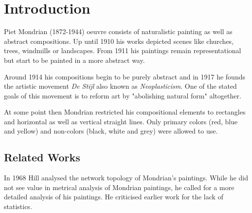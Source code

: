 \section{Introduction}

Piet Mondrian (1872-1944) oeuvre consists of naturalistic painting as well
as abstract compositions. Up until 1910 his works depicted scenes like
churches, trees, windmills or landscapes. From 1911 his paintings
remain representational but start to be painted in a more abstract way.

Around 1914 his compositions begin to be purely abstract and in 1917 he founds
the artistic movement \textit{De Stijl} also known as \textit{Neoplasticism}.
One of the stated goals of this movement is to reform art by "abolishing natural
form" \cite{wiki:manifest} altogether.

At some point then Mondrian restricted his compositional elements to rectangles
and horizontal as well as vertical straight lines. Only primary colors (red, blue and
yellow) and non-colors (black, white and grey) were allowed to use.





\subsection{Related Works}


In 1968 Hill \cite{Hill1968} analysed the network topology of Mondrian's paintings.
While he did not see value in metrical analysis of Mondrian paintings, he called
for a more detailed analysis of his paintings. He criticised earlier work for
the lack of statistics.

